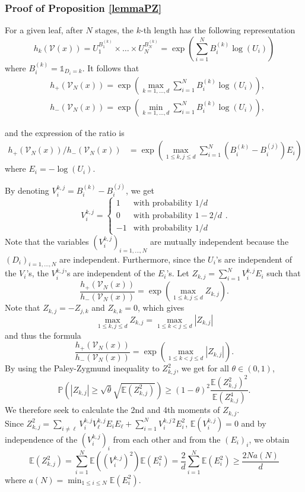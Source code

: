 \documentclass[paper=a4, fontsize=11pt]{scrartcl}
\newcommand{\ind}{\mathds{1}}
\newcommand{\PP}{\mathbb{P}}
\newcommand{\EE}{\mathbb{E}}
\begin{document}
\subsubsection*{Proof of Proposition \ref{lemmaPZ}}
For a given leaf, after $N$ stages,  the $k$-th length has the following representation 
$$ h _ k(\mathcal V (x) ) = U_1^{B_1^{(k)}}\times \ldots \times U_N^{B_N^{(k)}} = \exp\left( \sum_{i=1} ^ N B_i^{(k)} \log(U_i) \right)  $$
where $B_i^{(k)}  = \ind_{D_i = k }$. It follows that
\begin{align*}
 &h_+(\mathcal V_N (x) ) = \exp\left( \max_{k=1,\ldots, d}  \sum_{i=1} ^ N B_i^{(k)} \log(U_i) \right), \\
 &h_-(\mathcal V_N (x) ) =  \exp\left(\min_{k=1,\ldots, d}  \sum_{i=1} ^ N B_i^{(k)} \log(U_i) \right), 
\end{align*}

and the expression of the ratio is
\begin{align*}
 h_+(\mathcal V_N (x) ) / h_-(\mathcal V_N (x) )  &= \exp \left(   \max_{1 \leq k,j \leq d} \sum_{i=1} ^N (B_i^{(k)} - B_i^{(j)} ) E_i \right) \end{align*}
where $E_i = - \log(U_i)$.

By denoting $V_i^{k,j} = B_i^{(k)} - B_i^{(j)}$, we get
\[V_i^{k,j} = \begin{cases} 
1 & \text{with probability } 1/d \\
0 & \text{with probability } 1 - 2/d \\
-1 & \text{with probability } 1/d 
\end{cases}.\]
Note that the variables \((V_i^{k,j})_{i=1,\dots,N}\) are mutually independent because the \((D_i)_{i=1,\dots,N}\) are independent. Furthermore, since the \(U_i\)'s are independent of the \(V_i\)'s, the \(V_i^{k,j}\)'s are independent of the \(E_i\)'s. Let \(Z_{k,j} = \sum_{i=1}^{N} V_i^{k,j} E_i\) such that
\[
\frac{h_+(\mathcal V_N (x) )}{h_-(\mathcal V_N (x) )} = \exp \left( \max_{1 \leq k,j \leq d} Z_{k,j} \right).
\]
Note that \(Z_{k,j} = - Z_{j,k}\) and \(Z_{k,k} = 0\), which gives
\[
\max_{1 \leq k,j \leq d} Z_{k,j} = \max_{1 \leq k < j \leq d} | Z_{k,j} |
\]
and thus the formula 
\[
\frac{h_+(\mathcal V_N (x) )}{h_-(\mathcal V_N (x) )} = \exp \left( \max_{1 \leq k < j \leq d} | Z_{k,j} | \right).
\]
By using the Paley-Zygmund inequality to $Z_{k,j}^2$, we get for all $\theta \in (0,1)$,
\[
\PP\left(|Z_{k,j}| \geq \sqrt{\theta} \sqrt{\mathbb{E}(Z_{k,j}^2)} \right) \geq (1-\theta)^2 \frac{\mathbb{E}(Z_{k,j}^2)^2}{\mathbb{E}(Z_{k,j}^4)}.
\]
We therefore seek to calculate the 2nd and 4th moments of \(Z_{k,j}\). \\ Since \(Z_{k,j}^2 = \sum_{i \neq \ell} V_i^{k,j} V_\ell^{k,j} E_i E_\ell + \sum_{i=1}^N V_i^{k,j \, 2} E_i^2 \), \(\mathbb{E}(V_i^{k,j}) = 0\) and by independence of the \((V_i^{k,j})_i\) from each other and from the \((E_i)_i\), we obtain 
$$\mathbb E(Z_{k,j}^2) = \sum_{i=1}^N \mathbb{E}((V_i^{k,j})^2) \mathbb{E}(E_i^2) = \frac{2}{d} \sum_{i=1}^N \mathbb{E}(E_i^2) \geq \frac{2N a(N)}{d}$$
where $a(N) = \min_{1 \leq i \leq N} \EE(E_i^2).$ 
\end{document}
